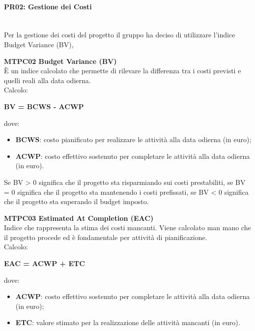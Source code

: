 \paragraph{PR02: Gestione dei Costi} \-\\
Per la gestione dei costi del progetto il gruppo ha deciso di utilizzare l'indice Budget Variance (BV),

\begin{itemize}

\item \textbf{MTPC02 Budget Variance (BV)}\-\\
È un indice calcolato che permette di rilevare la differenza tra i costi previsti e quelli reali alla data odierna. \\
Calcolo:
\begin{center}
	\item \textbf{BV = BCWS - ACWP}
\end{center} 
dove:
\begin{itemize}
	\item \textbf{BCWS}: costo pianificato per realizzare le attività alla data odierna (in euro);
	\item \textbf{ACWP}: costo effettivo sostenuto per completare le attività alla data odierna (in euro).
\end{itemize}
Se BV > 0 significa che il progetto sta risparmiando sui costi prestabiliti, se BV = 0 significa che il progetto sta mantenendo i costi prefissati, se BV < 0 significa che il progetto sta superando il budget imposto.

\item \textbf{MTPC03 Estimated At Completion (EAC)}\-\\
Indice che rappresenta la stima dei costi mancanti. Viene calcolato man mano che il progetto procede ed è fondamentale per attività di pianificazione. \\
Calcolo:
\begin{center}
	\item \textbf{EAC = ACWP + ETC}
\end{center}
dove:
\begin{itemize}
	\item \textbf{ACWP}: costo effettivo sostenuto per completare le attività alla data odierna (in euro);
	\item \textbf{ETC}: valore stimato per la realizzazione delle attività mancanti (in euro).
\end{itemize}

\end{itemize}

